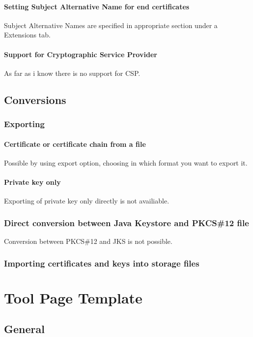 \documentclass[10pt, a4paper]{report}
\begin{document}
    \subsubsection{Setting Subject Alternative Name for end certificates}
Subject Alternative Names are specified in appropriate section under a Extensions tab.
    \subsubsection{Support for Cryptographic Service Provider}
As far as i know there is no support for CSP.
\section{Conversions}

  \subsection{Exporting}
  
    \subsubsection{Certificate or certificate chain from a file}
Possible by using export option, choosing in which format you want to export it.
    \subsubsection{Private key only}
Exporting of private key only directly is not availiable.
  \subsection{Direct conversion between Java Keystore and PKCS\#12 file}
Conversion between PKCS\#12 and JKS is not possible.
  \subsection{Importing certificates and keys into storage files}


\chapter{Tool Page Template}

\section{General}
\end{document}
